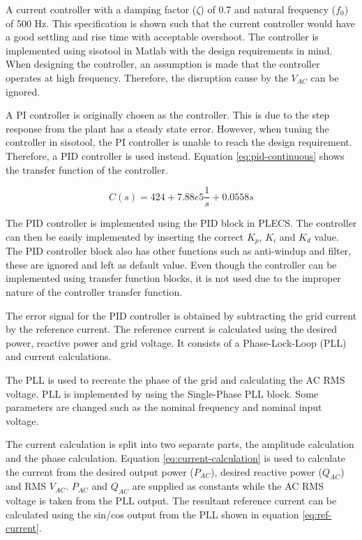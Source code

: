 \documentclass[12pt]{article}
\begin{document}
A current controller with a damping factor ($\zeta$) of 0.7 and natural frequency ($f_0$) of 500 Hz.
This specification is shown such that the current controller would have a good settling and rise time with acceptable overshoot.
The controller is implemented using sisotool in Matlab with the design requirements in mind.
When designing the controller, an assumption is made that the controller operates at high frequency.
Therefore, the disruption cause by the $V_{AC}$ can be ignored.

A PI controller is originally chosen as the controller.
This is due to the step response from the plant has a steady state error.
However, when tuning the controller in sisotool, the PI controller is unable to reach the design requirement.
Therefore, a PID controller is used instead.
Equation \ref{eq:pid-continuous} shows the transfer function of the controller.

\begin{equation} \label{eq:pid-continuous}
    C(s) = 424 + 7.88e5 \frac{1}{s} + 0.0558 s
\end{equation}

The PID controller is implemented using the PID block in PLECS.
The controller can then be easily implemented by inserting the correct $K_p$, $K_i$ and $K_d$ value.
The PID controller block also has other functions such as anti-windup and filter, these are ignored and left as default value.
Even though the controller can be implemented using transfer function blocks, it is not used due to the improper nature of the controller transfer function.

The error signal for the PID controller is obtained by subtracting the grid current by the reference current.
The reference current is calculated using the desired power, reactive power and grid voltage.
It consists of a Phase-Lock-Loop (PLL) and current calculations.

The PLL is used to recreate the phase of the grid and calculating the AC RMS voltage.
PLL is implemented by using the Single-Phase PLL block.
Some parameters are changed such as the nominal frequency and nominal input voltage.

The current calculation is split into two separate parts, the amplitude calculation and the phase calculation.
Equation \ref{eq:current-calculation} is used to calculate the current from the desired output power ($P_{AC}$), desired reactive power ($Q_{AC}$) and RMS $V_{AC}$.
$P_{AC}$ and $Q_{AC}$ are supplied as constants while the AC RMS voltage is taken from the PLL output.
The resultant reference current can be calculated using the sin/cos output from the PLL shown in equation \ref{eq:ref-current}.
\end{document}
